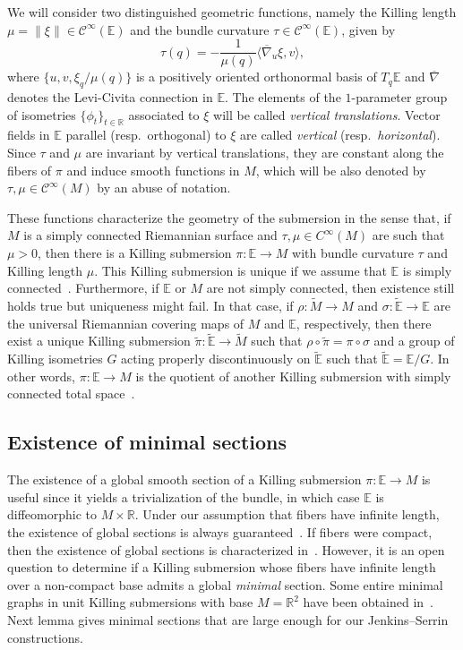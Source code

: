\documentclass[a4paper,10pt,reqno]{amsart}
\newcommand{\R}{\mathbb{R}}
\newcommand{\E}{\mathbb{E}}
\theoremstyle{definition}
\theoremstyle{remark}
\numberwithin{equation}{section}
\begin{document}
We will consider two distinguished geometric functions, namely the Killing length $\mu=\|\xi\|\in\mathcal{C}^\infty(\E)$ and the bundle curvature $\tau\in\mathcal{C}^\infty(\E)$, given by 
\begin{equation}\label{BundleCurvature}
	\tau(q)=-\frac{1}{\mu(q)}\langle\overline\nabla_u\xi,v\rangle,
\end{equation}		 
where $\{u,v,\xi_q/\mu(q)\}$ is a positively oriented orthonormal basis of $T_q\E$ and $\overline\nabla$ denotes the Levi-Civita connection in $\E$. The elements of the $1$-parameter group of isometries $\{\phi_t\}_{t\in\R}$ associated to $\xi$ will be called \emph{vertical translations}. Vector fields in $\E$ parallel (resp.\ orthogonal) to $\xi$ are called \emph{vertical} (resp.\ \emph{horizontal}). Since $\tau$ and $\mu$ are invariant by vertical translations, they are constant along the fibers of $\pi$ and induce smooth functions in $M$, which will be also denoted by $\tau,\mu\in\mathcal{C}^\infty(M)$ by an abuse of notation.		

These functions characterize the geometry of the submersion in the sense that, if $M$ is a simply connected Riemannian surface and $\tau,\mu\in C^\infty(M)$ are such that $\mu>0$, then there is a Killing submersion $\pi:\E\to M$ with bundle curvature $\tau$ and Killing length $\mu$. This Killing submersion is unique if we assume that $\E$ is simply connected~\cite[Thms.~2.6 and~2.9]{LerMan}. Furthermore, if $\E$ or $M$ are not simply connected, then existence still holds true but uniqueness might fail. In that case, if $\rho\colon\widetilde{M}\to M$ and $\sigma\colon\widetilde{\E}\to\E$ are the universal Riemannian covering maps of $M$ and $\E$, respectively, then there exist a unique Killing submersion $\widetilde{\pi}\colon\widetilde{\E}\to\widetilde{M}$ such that $\rho\circ\widetilde{\pi}=\pi\circ\sigma$ and a group of Killing isometries $G$ acting properly discontinuously on $\widetilde{\E}$ such that $\widetilde{\E}=\E/G$. In other words, $\pi:\E\to M$ is the quotient of another Killing submersion with simply connected total space~\cite[Thm~2.14]{LerMan}.


\subsection{Existence of minimal sections}
The existence of a global smooth section of a Killing submersion $\pi:\E\to M$ is useful since it yields a trivialization of the bundle, in which case $\E$ is diffeomorphic to $M\times\R$. Under our assumption that fibers have infinite length, the existence of global sections is always guaranteed~\cite[Thm.~12.2]{Steenrod}. If fibers were compact, then the existence of global sections is characterized in~\cite[Prop.~3.3]{LerMan}. However, it is an open question to determine if a Killing submersion whose fibers have infinite length over a non-compact base admits a global \emph{minimal} section. Some entire minimal graphs in unit Killing submersions with base $M=\R^2$ have been obtained in~\cite{DLM}. Next lemma gives minimal sections that are large enough for our Jenkins--Serrin constructions.
\end{document}
